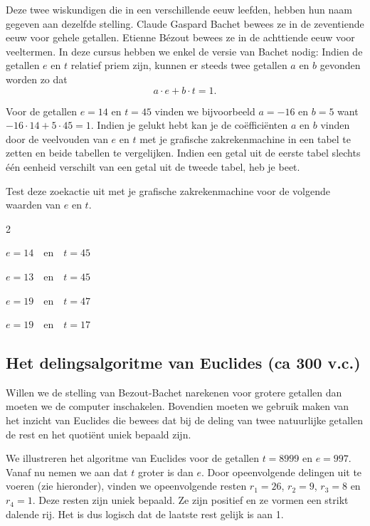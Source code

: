 Deze twee wiskundigen die in een verschillende eeuw leefden, hebben hun naam gegeven aan dezelfde stelling. Claude Gaspard Bachet bewees ze in de zeventiende eeuw voor gehele getallen. Etienne Bézout bewees ze in de achttiende eeuw voor veeltermen. In deze cursus hebben we enkel de versie van Bachet nodig: Indien de getallen $e$ en $t$ relatief priem zijn, kunnen er steeds twee getallen $a$ en $b$ gevonden worden zo dat
\[a \cdot e + b \cdot t = 1.\]

Voor de getallen $e=14$ en $t=45$ vinden we bijvoorbeeld $a=-16$ en $b=5$ want $-16 \cdot 14 + 5 \cdot 45 =1$. Indien je gelukt hebt kan je de coëfficiënten $a$ en $b$ vinden door de veelvouden van $e$ en $t$ met je grafische zakrekenmachine in een tabel te zetten en beide tabellen te vergelijken. Indien een getal uit de eerste tabel slechts één eenheid verschilt van een getal uit de tweede tabel, heb je beet.

\begin{oef}
Test deze zoekactie uit met je grafische zakrekenmachine voor de volgende waarden van $e$ en $t$.

\begin{multicols} {2}
\begin{enumoef}
\item $e=14 \quad \textrm{en} \quad t=45$
\item $e=13 \quad \textrm{en} \quad t=45$
\item $e=19 \quad \textrm{en} \quad t=47$
\item $e=19 \quad \textrm{en} \quad t=17$
\end{enumoef}
\end{multicols}
\end{oef}

\subsection{Het delingsalgoritme van Euclides (ca 300 v.c.)}

Willen we de stelling van Bezout-Bachet narekenen voor grotere getallen dan moeten we de computer inschakelen. Bovendien moeten we gebruik maken van het inzicht van Euclides die bewees dat bij de deling van twee natuurlijke getallen de rest en het quotiënt uniek bepaald zijn.

We illustreren het algoritme van Euclides voor de getallen $t=8999$ en $e=997$. Vanaf nu nemen we aan dat $t$ groter is dan $e$. Door opeenvolgende delingen uit te voeren (zie hieronder), vinden we opeenvolgende resten $r_1=26$, $r_2=9$, $r_3=8$ en $r_4=1$. Deze resten zijn uniek bepaald. Ze zijn positief en ze vormen een strikt dalende rij. Het is dus logisch dat de laatste rest gelijk is aan 1.

